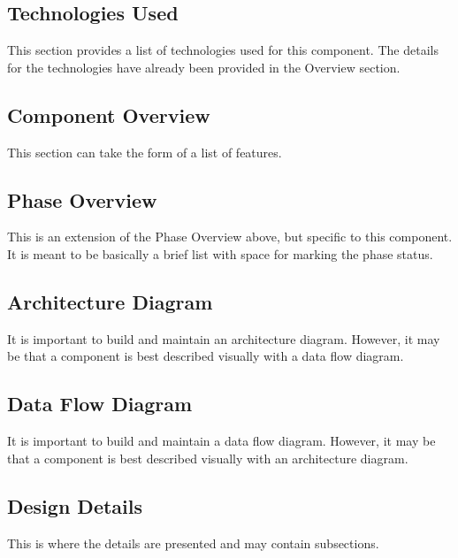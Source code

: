 \subsection{Technologies  Used}
This section provides a list of technologies used for this component.  The details 
for the technologies have already been provided in the Overview section. 

\subsection{Component  Overview}
This section can take the form of a list of features. 

\subsection{Phase Overview}
This is an extension of the Phase Overview above, but specific to this component. 
 It is meant to be basically a brief list with space for marking the phase status. 

\subsection{ Architecture  Diagram}
It is important to build and maintain an architecture diagram.  However, it may 
be that a component is best described visually with a data flow diagram. 


\subsection{Data Flow Diagram}
It is important to build and maintain a data flow diagram.  However, it may be 
that a component is best described visually with an architecture diagram. 


\subsection{Design Details}
This is where the details are presented and may contain subsections. 


